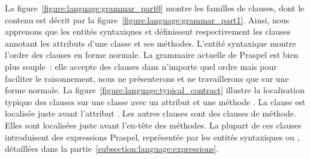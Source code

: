 La figure~\ref{figure:language:grammar_part0} montre les familles de clauses,
dont le contenu est décrit par la figure~\ref{figure:language:grammar_part1}.
Ainsi, nous apprenons que les entités syntaxiques  et
 définissent respectivement les clauses annotant les
attributs d'une classe et ses méthodes.  L'entité syntaxique
 montre l'ordre des clauses en forme normale. La grammaire
actuelle de Praspel est bien plus souple~: elle accepte des clauses dans
n'importe quel ordre mais pour faciliter le raisonnement, nous ne présenterons
et ne travaillerons que sur une forme normale. La
figure~\ref{figure:language:typical_contract} illustre la localisation typique
des clauses sur une classe  avec un attribut  et une méthode
. La clause \ainvariant est localisée juste avant l'attribut .
Les autres clauses sont des clauses de méthode.  Elles sont localisées juste
avant l'en-tête des méthodes. La plupart de ces clauses introduisent des
expressions Praspel, représentée par les entités syntaxiques 
ou , détaillées dans la
partie~\ref{subsection:language:expressions}.

